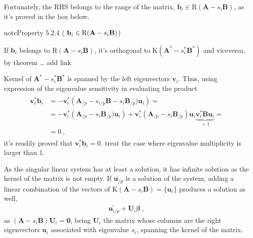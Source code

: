 \documentclass[letterpaper,10pt,english]{jupyterBook}
\begin{document}
\sphinxAtStartPar
Fortunately, the RHS belongs to the range of the matrix, \(\mathbf{b}_i \in \text{R}(\mathbf{A}- s_i \mathbf{B})\), as it’s proved in the box below.
\label{ch/linear-algebra/spectral-sensitivity:property-3}
\begin{sphinxadmonition}{note}{Property 5.2.4 (\protect\(\ \mathbf{b}_i \in \text{R}(\mathbf{A} - s_i \mathbf{B})\protect\))}



\sphinxAtStartPar
If \(\mathbf{b}_i\) belongs to \(\text{R}(\mathbf{A} - s_i \mathbf{B})\), it’s orthogonal to \(\text{K}(\mathbf{A}^* - s_i^* \mathbf{B}^*)\) and viceversa, by theorem …  add link

\sphinxAtStartPar
Kernel of \(\mathbf{A}^* - s_i^* \mathbf{B}^*\) is spanned by the left eigenvectors \(\mathbf{v}_i\). Thus, using expression of the eigenvalue sensitivity in evaluating the product
\begin{equation*}
\begin{split}\begin{aligned}
  \mathbf{v}_i^* \mathbf{b}_i 
  & = - \mathbf{v}_i^* \left(  \mathbf{A}_{/p} - s_{i/p} \mathbf{B} - s_i \mathbf{B}_{/p}) \mathbf{u}_i \right) = \\
  & = - \mathbf{v}_i^* \left(  \mathbf{A}_{/p} - s_i \mathbf{B}_{/p}) \mathbf{u}_i \right) + \mathbf{v}_i^* \left( \mathbf{A}_{/p} - s_i \mathbf{B}_{/p} \right) \mathbf{u}_i  \underbrace{\mathbf{v}_i^* \mathbf{B} \mathbf{u}_i}_{ = 1} = \\
  & = 0 \ ,
\end{aligned}\end{split}
\end{equation*}
\sphinxAtStartPar
it’s readily proved that \(\mathbf{v}^*_i \mathbf{b}_i = 0\).  treat the case where eigenvalue multiplicity is larger than 1.
\end{sphinxadmonition}

\sphinxAtStartPar
As the singular linear system has at least a solution, it has infinite solution as the kernel of the matrix is not empty. If \(\widetilde{\mathbf{u}_{/p}}\) is a solution of the system, adding a linear combination of the vectors of \(\text{K}(\mathbf{A} - s_i \mathbf{B}) = \{ \mathbf{u}_i \}\) produces a solution as well,
\begin{equation*}
\begin{split}\widetilde{\mathbf{u}_{i/p}} + \mathbf{U}_i \boldsymbol{\beta} \ ,\end{split}
\end{equation*}
\sphinxAtStartPar
as \((\mathbf{A} - s_i \mathbf{B}) \mathbf{U}_i = \mathbf{0}\), being \(\mathbf{U}_i\) the matrix whose columns are the right eigenvectors \(\mathbf{u}_i\) associated with eigenvalue \(s_i\), spanning the kernel of the matrix.
\end{document}

